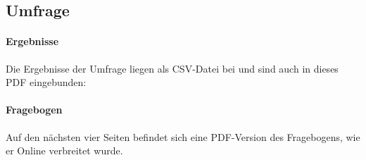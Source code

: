 \documentclass[a4paper]{article}
\begin{document}
        \subsection{Umfrage}
            \paragraph{Ergebnisse}
                Die Ergebnisse der Umfrage liegen als CSV-Datei bei und sind auch in dieses PDF eingebunden: 
            \paragraph{Fragebogen}
                Auf den nächsten vier Seiten befindet sich eine PDF-Version des Fragebogens, wie er Online verbreitet wurde.
                
\end{document}
